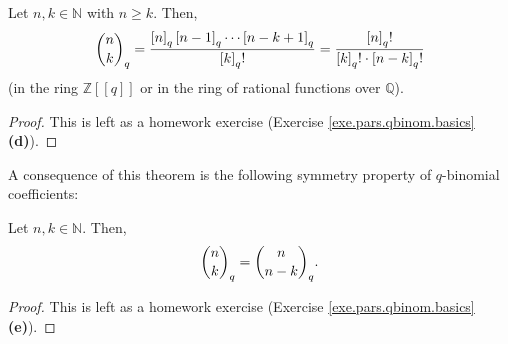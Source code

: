 \begin{theorem}
\label{thm.pars.qbinom.quot2}Let $n,k\in\mathbb{N}$ with $n\geq k$. Then,%
\[
\dbinom{n}{k}_{q}=\dfrac{\left[  n\right]  _{q}\left[  n-1\right]  _{q}%
\cdots\left[  n-k+1\right]  _{q}}{\left[  k\right]  _{q}!}=\dfrac{\left[
n\right]  _{q}!}{\left[  k\right]  _{q}!\cdot\left[  n-k\right]  _{q}!}%
\]
(in the ring $\mathbb{Z}\left[  \left[  q\right]  \right]  $ or in the ring of
rational functions over $\mathbb{Q}$).
\end{theorem}

\begin{proof}
This is left as a homework exercise (Exercise \ref{exe.pars.qbinom.basics}
\textbf{(d)}).
\end{proof}

A consequence of this theorem is the following symmetry property of
$q$-binomial coefficients:

\begin{proposition}
\label{prop.pars.qbinom.symm}Let $n,k\in\mathbb{N}$. Then,%
\[
\dbinom{n}{k}_{q}=\dbinom{n}{n-k}_{q}.
\]

\end{proposition}

\begin{proof}
This is left as a homework exercise (Exercise \ref{exe.pars.qbinom.basics}
\textbf{(e)}).
\end{proof}

